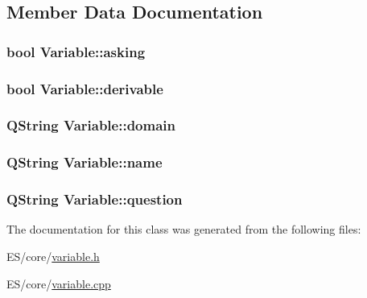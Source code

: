 \subsection{Member Data Documentation}
\hypertarget{class_variable_a3f0d53d3639fc183dc828cf74ed6e6dd}{
\subsubsection[{asking}]{\setlength{\rightskip}{0pt plus 5cm}bool {\bf Variable::asking}}}
\label{class_variable_a3f0d53d3639fc183dc828cf74ed6e6dd}
\hypertarget{class_variable_a0a89365d32a58cb17154e28a7503a165}{
\subsubsection[{derivable}]{\setlength{\rightskip}{0pt plus 5cm}bool {\bf Variable::derivable}}}
\label{class_variable_a0a89365d32a58cb17154e28a7503a165}
\hypertarget{class_variable_a74e964b965c028ef8c485ef8a0b3c08e}{
\subsubsection[{domain}]{\setlength{\rightskip}{0pt plus 5cm}QString {\bf Variable::domain}}}
\label{class_variable_a74e964b965c028ef8c485ef8a0b3c08e}
\hypertarget{class_variable_a6602fc2ef694dd77e478f0668fcaa1b5}{
\subsubsection[{name}]{\setlength{\rightskip}{0pt plus 5cm}QString {\bf Variable::name}}}
\label{class_variable_a6602fc2ef694dd77e478f0668fcaa1b5}
\hypertarget{class_variable_a8432edfe9f00686908c58807a9503596}{
\subsubsection[{question}]{\setlength{\rightskip}{0pt plus 5cm}QString {\bf Variable::question}}}
\label{class_variable_a8432edfe9f00686908c58807a9503596}


The documentation for this class was generated from the following files:\begin{DoxyCompactItemize}
\item 
ES/core/\hyperlink{variable_8h}{variable.h}\item 
ES/core/\hyperlink{variable_8cpp}{variable.cpp}\end{DoxyCompactItemize}
